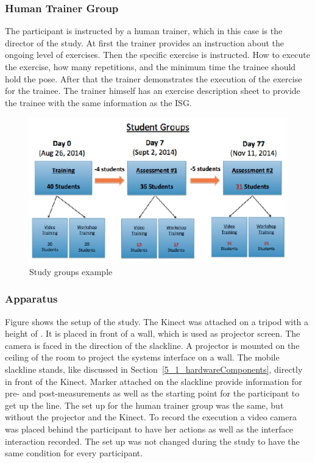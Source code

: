 \subsubsection{Human Trainer Group}
The participant is instructed by a human trainer, which in this case is the director of the study.
At first the trainer provides an instruction about the ongoing level of exercises.
Then the specific exercise is instructed. How to execute the exercise, how many repetitions, and the minimum time the trainee should hold the pose.
After that the trainer demonstrates the execution of the exercise for the trainee.
The trainer himself has an exercise description sheet to provide the trainee with the same information as the ISG.
\begin{figure}[htb]
	\centering
	\begin{minipage}[t]{1\linewidth}
		\centering
		\includegraphics[width=0.8\linewidth]{Pictures/6_studyGroupsExample}
		\caption{Study groups example}
		\label{fig:6_studyGroups}
	\end{minipage}
\end{figure}

\subsubsection{Apparatus}
Figure \todo{[figure]} shows the setup of the study.
The Kinect was attached on a tripod with a height of \todo{90 cm}.
It is placed in front of a wall, which is used as projector screen.
The camera is faced in the direction of the slackline.
A projector is mounted on the ceiling of the room to project the systems interface on a wall.
The mobile slackline stands, like discussed in Section~\ref{5_1_hardwareComponents}, directly in front of the Kinect.
Marker attached on the slackline provide information for pre- and post-measurements as well as the starting point for the participant to get up the line.
The set up for the human trainer group was the same, but without the projector and the Kinect.
To record the execution a video camera was placed behind the participant to have her actions as well as the interface interaction recorded.
The set up was not changed during the study to have the same condition for every participant.

